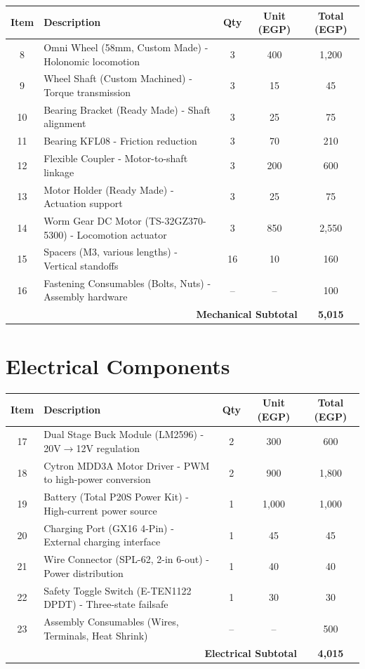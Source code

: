\begin{longtable}{|c|p{4cm}|c|c|c|}
\hline
\textbf{Item} & \textbf{Description} & \textbf{Qty} & \textbf{Unit (EGP)} & \textbf{Total (EGP)} \\
\hline
\endhead
8 & Omni Wheel (58mm, Custom Made) - Holonomic locomotion & 3 & 400 & 1,200 \\
9 & Wheel Shaft (Custom Machined) - Torque transmission & 3 & 15 & 45 \\
10 & Bearing Bracket (Ready Made) - Shaft alignment & 3 & 25 & 75 \\
11 & Bearing KFL08 - Friction reduction & 3 & 70 & 210 \\
12 & Flexible Coupler - Motor-to-shaft linkage & 3 & 200 & 600 \\
13 & Motor Holder (Ready Made) - Actuation support & 3 & 25 & 75 \\
14 & Worm Gear DC Motor (TS-32GZ370-5300) - Locomotion actuator & 3 & 850 & 2,550 \\
15 & Spacers (M3, various lengths) - Vertical standoffs & 16 & 10 & 160 \\
16 & Fastening Consumables (Bolts, Nuts) - Assembly hardware & -- & -- & 100 \\
\hline
\multicolumn{4}{|r|}{\textbf{Mechanical Subtotal}} & \textbf{5,015} \\
\hline
\end{longtable}

\section{Electrical Components}

\begin{longtable}{|c|p{4cm}|c|c|c|}
\hline
\textbf{Item} & \textbf{Description} & \textbf{Qty} & \textbf{Unit (EGP)} & \textbf{Total (EGP)} \\
\hline
\endhead
17 & Dual Stage Buck Module (LM2596) - 20V$\rightarrow$12V regulation & 2 & 300 & 600 \\
18 & Cytron MDD3A Motor Driver - PWM to high-power conversion & 2 & 900 & 1,800 \\
19 & Battery (Total P20S Power Kit) - High-current power source & 1 & 1,000 & 1,000 \\
20 & Charging Port (GX16 4-Pin) - External charging interface & 1 & 45 & 45 \\
21 & Wire Connector (SPL-62, 2-in 6-out) - Power distribution & 1 & 40 & 40 \\
22 & Safety Toggle Switch (E-TEN1122 DPDT) - Three-state failsafe & 1 & 30 & 30 \\
23 & Assembly Consumables (Wires, Terminals, Heat Shrink) & -- & -- & 500 \\
\hline
\multicolumn{4}{|r|}{\textbf{Electrical Subtotal}} & \textbf{4,015} \\
\hline
\end{longtable}

